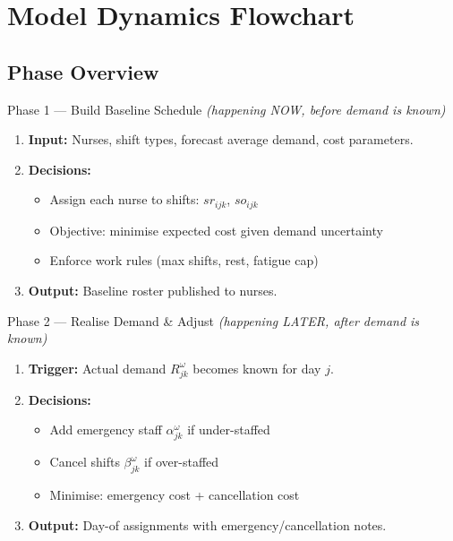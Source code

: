 \documentclass[12pt,a4paper]{article}
\begin{document}
\newpage
\section{Model Dynamics Flowchart}

\subsection{Phase Overview}

\begin{phasebox}[royalblue]{Phase 1 — Build Baseline Schedule \hfill\textit{(happening NOW, before demand is known)}}
\begin{enumerate}[itemsep=3pt]
  \item \textbf{Input:} Nurses, shift types, forecast average demand, cost parameters.
  \item \textbf{Decisions:}
    \begin{itemize}
      \item Assign each nurse to shifts: $sr_{ijk}$, $so_{ijk}$
      \item Objective: minimise expected cost given demand uncertainty
      \item Enforce work rules (max shifts, rest, fatigue cap)
    \end{itemize}
  \item \textbf{Output:} Baseline roster published to nurses.
\end{enumerate}
\end{phasebox}

\vspace{8pt}
\begin{phasebox}[accentgreen]{Phase 2 — Realise Demand \& Adjust \hfill\textit{(happening LATER, after demand is known)}}
\begin{enumerate}[itemsep=3pt]
  \item \textbf{Trigger:} Actual demand $R_{jk}^{\omega}$ becomes known for day $j$.
  \item \textbf{Decisions:}
    \begin{itemize}
      \item Add emergency staff $\alpha_{jk}^{\omega}$ if under-staffed
      \item Cancel shifts $\beta_{jk}^{\omega}$ if over-staffed
      \item Minimise: emergency cost + cancellation cost
    \end{itemize}
  \item \textbf{Output:} Day-of assignments with emergency/cancellation notes.
\end{enumerate}
\end{phasebox}
\end{document}
